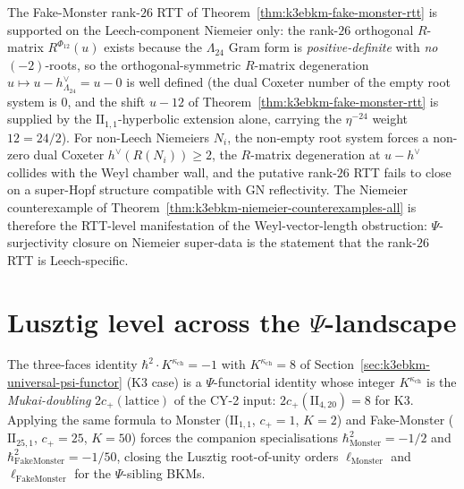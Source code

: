\begin{remark}
\label{rem:k3ebkm-niemeier-vs-rtt-obstruction}
The Fake-Monster rank-$26$ RTT of
Theorem~\ref{thm:k3ebkm-fake-monster-rtt} is supported on the
Leech-component Niemeier only: the rank-$26$ orthogonal $R$-matrix
$R^{\Phi_{12}}(u)$ exists because the $\Lambda_{24}$ Gram form is
\emph{positive-definite} with \emph{no} $(-2)$-roots, so the
orthogonal-symmetric $R$-matrix degeneration
$u\mapsto u - h^\vee_{\Lambda_{24}} = u - 0$ is well defined (the
dual Coxeter number of the empty root system is $0$, and the shift
$u - 12$ of Theorem~\ref{thm:k3ebkm-fake-monster-rtt} is supplied
by the $\mathrm{II}_{1,1}$-hyperbolic extension alone, carrying the
$\eta^{-24}$ weight $12 = 24/2$). For non-Leech Niemeiers $N_i$, the
non-empty root system forces a non-zero dual Coxeter $h^\vee(R(N_i))\ge 2$,
the $R$-matrix degeneration at $u - h^\vee$ collides with the Weyl
chamber wall, and the putative rank-$26$ RTT fails to close on a
super-Hopf structure compatible with GN reflectivity. The Niemeier
counterexample of Theorem~\ref{thm:k3ebkm-niemeier-counterexamples-all}
is therefore the RTT-level manifestation of the Weyl-vector-length
obstruction: $\Psi$-surjectivity closure on Niemeier super-data is
the statement that the rank-$26$ RTT is Leech-specific.
\end{remark}

\section{Lusztig level across the \texorpdfstring{$\Psi$}{Psi}-landscape}
\label{sec:k3ebkm-lusztig-level}

The three-faces identity
$\hbar^2\cdot K^{\kappa_{\mathrm{ch}}} = -1$ with $K^{\kappa_{\mathrm{ch}}} = 8$
of Section~\ref{sec:k3ebkm-universal-psi-functor} (K3 case) is a
$\Psi$-functorial identity whose integer $K^{\kappa_{\mathrm{ch}}}$ is
the \emph{Mukai-doubling} $2c_+(\mathrm{lattice})$ of the CY-2 input:
$2c_+(\mathrm{II}_{4,20}) = 8$ for K3. Applying the same formula to
Monster ($\mathrm{II}_{1,1}$, $c_+ = 1$, $K = 2$) and Fake-Monster
($\mathrm{II}_{25,1}$, $c_+ = 25$, $K = 50$) forces the companion
specialisations $\hbar^2_{\mathrm{Monster}} = -1/2$ and
$\hbar^2_{\mathrm{FakeMonster}} = -1/50$, closing the Lusztig
root-of-unity orders $\ell_{\mathrm{Monster}}$ and
$\ell_{\mathrm{FakeMonster}}$ for the $\Psi$-sibling BKMs.

